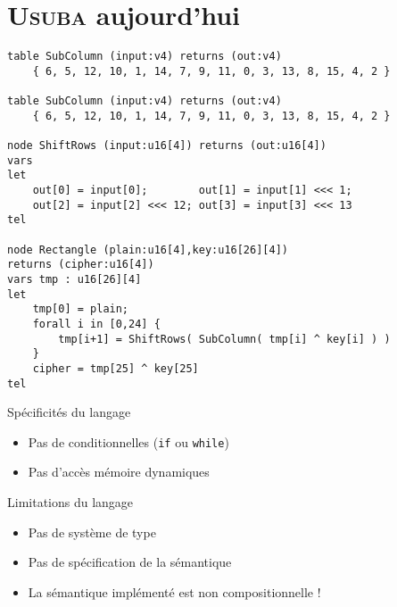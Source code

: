 \documentclass{beamer}
\author{Samuel \textsc{Vivien}, sous l'encadrement de Pierre-Évariste \textsc{Dagand}}
\title{\Usuba{}}
\date{\today}
\newcommand{\Usuba}{\textsc{Usuba}}
\begin{document}
\begin{frame}
    \titlepage
\end{frame}

\begin{frame}{}
    \tableofcontents
\end{frame}

\section{\Usuba{} aujourd'hui}

\begin{frame}[fragile]
\scriptsize
\begin{lstlisting}
table SubColumn (input:v4) returns (out:v4)
    { 6, 5, 12, 10, 1, 14, 7, 9, 11, 0, 3, 13, 8, 15, 4, 2 }

table SubColumn (input:v4) returns (out:v4)
    { 6, 5, 12, 10, 1, 14, 7, 9, 11, 0, 3, 13, 8, 15, 4, 2 }

node ShiftRows (input:u16[4]) returns (out:u16[4])
vars
let
    out[0] = input[0];        out[1] = input[1] <<< 1;
    out[2] = input[2] <<< 12; out[3] = input[3] <<< 13
tel

node Rectangle (plain:u16[4],key:u16[26][4])
returns (cipher:u16[4])
vars tmp : u16[26][4]
let
    tmp[0] = plain;
    forall i in [0,24] {
        tmp[i+1] = ShiftRows( SubColumn( tmp[i] ^ key[i] ) )
    }
    cipher = tmp[25] ^ key[25]
tel
\end{lstlisting}
\end{frame}

\begin{frame}{Spécificités du langage}
\begin{itemize}
\item<1-> Pas de conditionnelles (\texttt{if} ou \texttt{while})
\item<2-> Pas d'accès mémoire dynamiques
\end{itemize}

\end{frame}

\begin{frame}{Limitations du langage}
\begin{itemize}
\item<1-> Pas de système de type
\item<2-> Pas de spécification de la sémantique
\item<3-> La sémantique implémenté est non compositionnelle !
\end{itemize}

\medskip




\end{frame}
\end{document}
